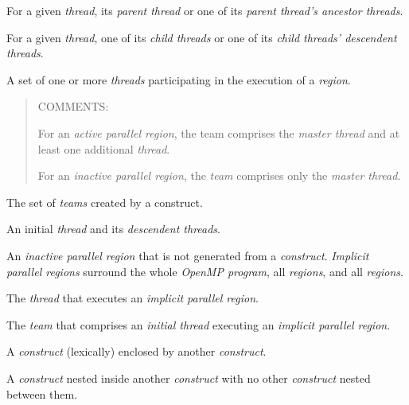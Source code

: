 \glossarydefstart
For a given \emph{thread}, its \emph{parent thread} or one of its 
\emph{parent thread's ancestor threads}.
\glossarydefend

\glossarydefstart
For a given \emph{thread}, one of its \emph{child threads} or one of
its \emph{child threads' descendent threads}.
\glossarydefend

\glossarydefstart
A set of one or more \emph{threads} participating in the execution 
of a 
\emph{region}.

\begin{quote}
COMMENTS:

For an \emph{active parallel region}, the team comprises the 
\emph{master thread} and at least one additional \emph{thread}.

For an \emph{inactive parallel region}, the \emph{team} comprises 
only the \emph{master thread}.
\end{quote}
\glossarydefend

\glossarydefstart
The set of \emph{teams} created by a  construct.
\glossarydefend

\glossarydefstart
An initial \emph{thread} and its \emph{descendent threads}.
\glossarydefend

\glossarydefstart
An \emph{inactive parallel region} that is not generated from a
 \emph{construct}. \emph{Implicit parallel regions} 
surround the whole \emph{OpenMP program}, all  
\emph{regions}, and all  \emph{regions}.

\glossarydefend

\glossarydefstart
The \emph{thread} that executes an \emph{implicit parallel region}.
\glossarydefend

\glossarydefstart
The \emph{team} that comprises an \emph{initial thread} executing 
an \emph{implicit parallel region}.
\glossarydefend

\glossarydefstart
A \emph{construct} (lexically) enclosed by another \emph{construct}.
\glossarydefend

\glossarydefstart
A \emph{construct} nested inside another \emph{construct} with no 
other \emph{construct} nested between them.
\glossarydefend

